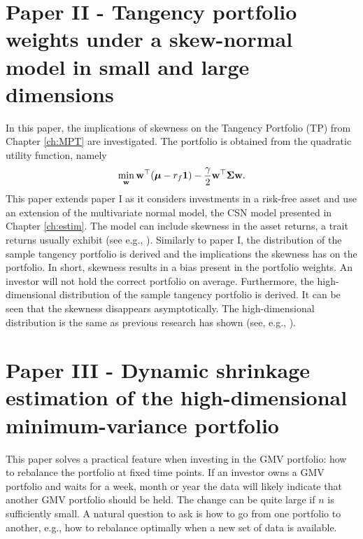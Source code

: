 \documentclass[12pt, twoside]{book}\usepackage{knitr}
\begin{document}
\section{Paper II - Tangency portfolio weights under a skew-normal model in small and large dimensions}\label{sec:paper2}
In this paper, the implications of skewness on the Tangency Portfolio (TP) from Chapter \ref{ch:MPT} are investigated. 
The portfolio is obtained from the quadratic utility function, namely
\begin{equation}
  \min_{\mathbf{w}} \mathbf{w}^\top (\mbox{\boldmath$\mu$} -r_f\mathbf{1}) - \frac{\gamma}{2} \mathbf{w}^\top \mathbf{\Sigma} \mathbf{w}.
\end{equation}
This paper extends paper I as it considers investments in a risk-free asset and use an extension of the multivariate normal model, the CSN model presented in Chapter \ref{ch:estim}. 
The model can include skewness in the asset returns, a trait returns usually exhibit (see e.g., \citet{cont2001empirical}). 
Similarly to paper I, the distribution of the sample tangency portfolio is derived and the implications the skewness has on the portfolio.
In short, skewness results in a bias present in the portfolio weights. 
An investor will not hold the correct portfolio on average.
Furthermore, the high-dimensional distribution of the sample tangency portfolio is derived.
It can be seen that the skewness disappears asymptotically. 
The high-dimensional distribution is the same as previous research has shown (see, e.g., \citet{karlsson2021statistical}).

\section{Paper III - Dynamic shrinkage estimation of the high-dimensional minimum-variance portfolio}\label{sec:paper3}
This paper solves a practical feature when investing in the GMV portfolio: how to rebalance the portfolio at fixed time points. 
If an investor owns a GMV portfolio and waits for a week, month or year the data will likely indicate that another GMV portfolio should be held.
The change can be quite large if $n$ is sufficiently small.
A natural question to ask is how to go from one portfolio to another, e.g., how to rebalance optimally when a new set of data is available. 
\end{document}
